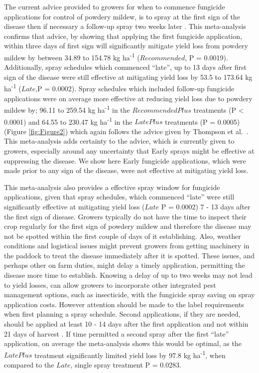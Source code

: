 \documentclass[agronomy,article,submit,moreauthors,pdftex]{mdpi}
\begin{document}
The current advice provided to growers for when to commence fungicide applications for control of powdery mildew, is to spray at the first sign of the disease then if necessary a follow-up spray two weeks later \citep{SueThompson2016, Sparks2017}.
This meta-analysis confirms that advice, by showing that applying the first fungicide application, within three days of first sign will significantly mitigate yield loss from powdery mildew by between 34.89 to 154.78 kg ha\textsuperscript{-1} (\(Recommended\), P = 0.0019).
Additionally, spray schedules which commenced ``late'', up to 13 days after first sign of the disease were still effective at mitigating yield loss by 53.5 to 173.64 kg ha\textsuperscript{-1} (\(Late\),P = 0.0002).
Spray schedules which included follow-up fungicide applications were on average more effective at reducing yield loss due to powdery mildew by;
96.11 to 259.54 kg ha\textsuperscript{-1} in the \(RecommendedPlus\) treatments (P \textless{} 0.0001) and
64.55 to 230.47 kg ha\textsuperscript{-1} in the \(LatePlus\) treatments (P = 0.0005) (Figure \ref{fig:Figure2})
which again follows the advice given by Thompson et al.~\citep{SueThompson2016}.
This meta-analysis adds certainty to the advice, which is currently given to growers, especially around any uncertainty that Early sprays might be effective at suppressing the disease.
We show here Early fungicide applications, which were made prior to any sign of the disease, were not effective at mitigating yield loss.

This meta-analysis also provides a effective spray window for fungicide applications, given that spray schedules, which commenced ``late'' were still significantly effective at mitigating yield loss (\(Late\) P = 0.0002) 7 - 13 days after the first sign of disease.
Growers typically do not have the time to inspect their crop regularly for the first sign of powdery mildew and therefore the disease may not be spotted within the first couple of days of it establishing.
Also, weather conditions and logistical issues might prevent growers from getting machinery in the paddock to treat the disease immediately after it is spotted.
These issues, and perhaps other on farm duties, might delay a timely application, permitting the disease more time to establish.
Knowing a delay of up to two weeks may not lead to yield losses, can allow growers to incorporate other integrated pest management options, such as insecticide, with the fungicide spray saving on spray application costs.
However attention should be made to the label requirements when first planning a spray schedule.
Second applications, if they are needed, should be applied at least 10 - 14 days after the first application and not within 21 days of harvest \citep{APVMAcustodia}.
If time permitted a second spray after the first ``late'' application, on average the meta-analysis shows this would be optimal, as the \(LatePlus\) treatment significantly limited yield loss by 97.8 kg ha\textsuperscript{-1}, when compared to the \(Late\), single spray treatment P = 0.0283.
\end{document}
